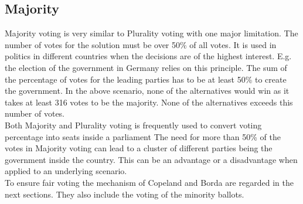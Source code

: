 \documentclass[german, a4paper, 11pt, oneside]{scrbook}
\begin{document}
\subsection{Majority}
Majority voting is very similar to Plurality voting with one major limitation. The number of votes for the solution must be over 50\% of all votes. It is used in politics in different countries when the decisions are of the highest interest. E.g. the election of the government in Germany relies on this principle. The sum of the percentage of votes for the leading parties has to be at least 50\% to create the government.  In the above scenario, none of the alternatives would win as it takes at least 316 votes to be the majority. None of the alternatives exceeds this number of votes. \\Both Majority and Plurality voting is frequently used to convert voting percentage into seats inside a parliament \cite{Blais.1988} The need for more than 50\% of the votes in Majority voting can lead to a cluster of different parties being the government inside the country. This can be an advantage or a disadvantage when applied to an underlying scenario.  \\To ensure fair voting the mechanism of Copeland and Borda are regarded in the next sections. They also include the voting of the minority ballots.
\end{document}
